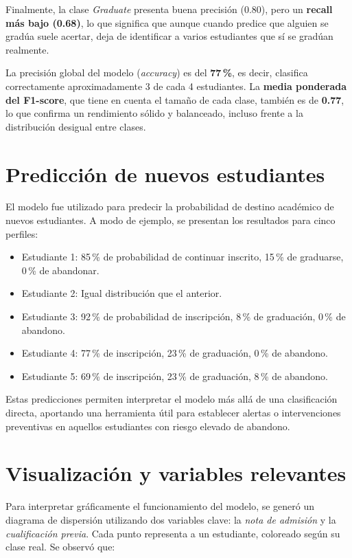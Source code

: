 \documentclass{report}[14pt]
\begin{document}
Finalmente, la clase \textit{Graduate} presenta buena precisión (0.80), pero un \textbf{recall más bajo (0.68)}, lo que significa que aunque cuando predice que alguien se gradúa suele acertar, deja de identificar a varios estudiantes que sí se gradúan realmente.

La precisión global del modelo (\textit{accuracy}) es del \textbf{77\,\%}, es decir, clasifica correctamente aproximadamente 3 de cada 4 estudiantes. La \textbf{media ponderada del F1-score}, que tiene en cuenta el tamaño de cada clase, también es de \textbf{0.77}, lo que confirma un rendimiento sólido y balanceado, incluso frente a la distribución desigual entre clases.


\section*{Predicción de nuevos estudiantes}

El modelo fue utilizado para predecir la probabilidad de destino académico de nuevos estudiantes. A modo de ejemplo, se presentan los resultados para cinco perfiles:

\begin{itemize}
  \item Estudiante 1: 85\,\% de probabilidad de continuar inscrito, 15\,\% de graduarse, 0\,\% de abandonar.
  \item Estudiante 2: Igual distribución que el anterior.
  \item Estudiante 3: 92\,\% de probabilidad de inscripción, 8\,\% de graduación, 0\,\% de abandono.
  \item Estudiante 4: 77\,\% de inscripción, 23\,\% de graduación, 0\,\% de abandono.
  \item Estudiante 5: 69\,\% de inscripción, 23\,\% de graduación, 8\,\% de abandono.
\end{itemize}

Estas predicciones permiten interpretar el modelo más allá de una clasificación directa, aportando una herramienta útil para establecer alertas o intervenciones preventivas en aquellos estudiantes con riesgo elevado de abandono.

\section*{Visualización y variables relevantes}

Para interpretar gráficamente el funcionamiento del modelo, se generó un diagrama de dispersión utilizando dos variables clave: la \textit{nota de admisión} y la \textit{cualificación previa}. Cada punto representa a un estudiante, coloreado según su clase real. Se observó que:
\end{document}
